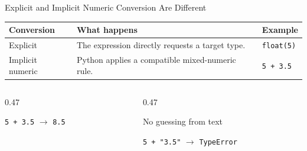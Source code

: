 \documentclass[aspectratio=169,10pt]{beamer}
\begin{document}
\begin{frame}{Explicit and Implicit Numeric Conversion Are Different}

  \begin{center}

    \begin{tabular}{p{1.45in} p{2.50in} p{1.90in}}
      \textbf{Conversion} & \textbf{What happens} & \textbf{Example} \\
      \hline
      Explicit & The expression directly requests a target type. & \texttt{float(5)} \\
      Implicit numeric & Python applies a compatible mixed-numeric rule. & \texttt{5 + 3.5} \\
    \end{tabular}

  \end{center}

  \vspace{0.12in}

  \begin{columns}[T,onlytextwidth]

    \begin{column}{0.47\textwidth}

      \begin{exampleblockcp}

        \texttt{5 + 3.5} $\rightarrow$ \texttt{8.5}

      \end{exampleblockcp}

    \end{column}

    \begin{column}{0.47\textwidth}

      \begin{alertblock}{No guessing from text}

        \texttt{5 + "3.5"} $\rightarrow$ \texttt{TypeError}

      \end{alertblock}

    \end{column}

  \end{columns}

\end{frame}
\end{document}
